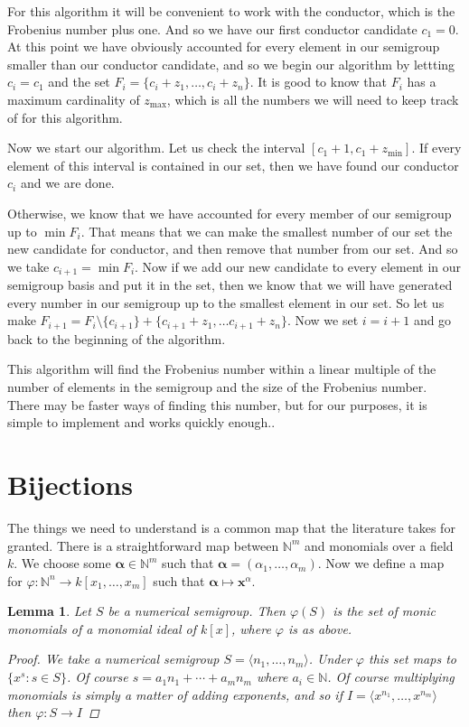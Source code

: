 \documentclass[11pt]{amsart}
\theoremstyle{plain}
\newtheorem{lemma}{Lemma}
\theoremstyle{definition}
\begin{document}
For this algorithm it will be convenient to work with the conductor, which is the Frobenius number plus one.
And so we have our first conductor candidate $c_1=0$.
At this point we have obviously accounted for every element in our semigroup smaller than our conductor candidate, and so we begin our algorithm by lettting $c_i=c_1$ and the set $F_i=\{c_i+z_1,\dots,c_i+z_n\}$.
It is good to know that $F_i$ has a maximum cardinality of $z_\text{max}$, which is all the numbers we will need to keep track of for this algorithm.

Now we start our algorithm.
Let us check the interval $[c_1+1,c_1+z_\text{min}]$.
If every element of this interval is contained in our set, then we have found our conductor $c_i$ and we are done.

Otherwise, we know that we have accounted for every member of our semigroup up to $\min F_i$. That means that we can make the smallest number of our set the new candidate for conductor, and then remove that number from our set. And so we take $c_{i+1}=\min F_i$. Now if we add our new candidate to every element in our semigroup basis and put it in the set, then we know that we will have generated every number in our semigroup up to the smallest element in our set. So let us make $F_{i+1}=F_i\setminus \{c_{i+1}\} + \{c_{i+1}+z_1,\dots c_{i+1}+z_n\}$. Now we set $i=i+1$ and go back to the beginning of the algorithm.

This algorithm will find the Frobenius number within a linear multiple of the number of elements in the semigroup and the size of the Frobenius number. There may be faster ways of finding this number, but for our purposes, it is simple to implement and works quickly enough.\cite{frobmask}.

\section{Bijections}
The things we need to understand is a common map that the literature takes for
granted. There is a straightforward map between $\mathbb{N}^m$ and monomials
over a field $k$. We choose some $\mathbf{\alpha}\in \mathbb{N}^m$ such that
$\mathbf{\alpha}=(\alpha_1,\dots,\alpha_m)$. Now we define a map for
$\varphi:\mathbb{N}^n\to k[x_1,\dots,x_m]$ such that $\mathbf{\alpha}\mapsto
\mathbf{x}^\alpha$.

\begin{lemma}
Let $S$ be a numerical semigroup.  Then $\varphi(S)$ is the set of monic
monomials of a monomial ideal of $k[x]$, where $\varphi$ is as above.
\begin{proof}
  We take a numerical semigroup $S=\langle n_1,\dots,n_m\rangle$. Under
$\varphi$ this set maps to $\{x^{s}:s\in S\}$. Of course $s=a_1n_1+\cdots+a_mn_m$
where $a_i\in \mathbb{N}$. Of course multiplying monomials is simply a matter
of adding exponents, and so if $I=\langle x^{n_1},\dots,x^{n_m}\rangle$ then
$\varphi:S\to I$
\end{proof}
\end{lemma}
\end{document}
